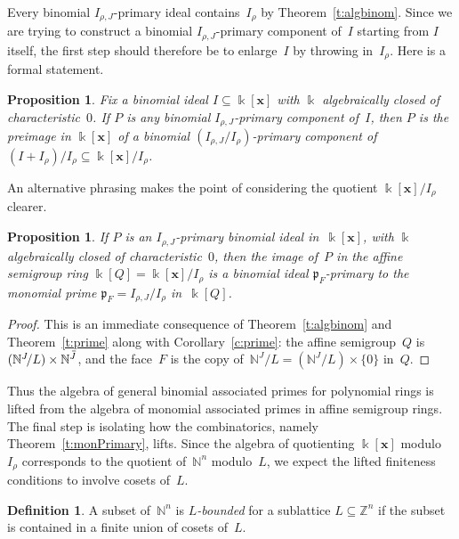 \documentclass[12pt]{amsart}
\numberwithin{equation}{section}
\newtheorem{prop}[thm]{Proposition}
\theoremstyle{definition}
\newtheorem{defn}[thm]{Definition}
\begin{document}
Every binomial $I_{\rho,J}$-primary ideal contains~$I_\rho$ by
Theorem~\ref{t:algbinom}.  Since
we are trying to construct a binomial $I_{\rho,J}$-primary component
of~$I$ starting from $I$ itself, the first step should therefore be to
enlarge~$I$ by throwing in~$I_\rho$.  Here is a formal statement.

\begin{prop}\label{p:polyringPrimary}
Fix a binomial ideal $I \subseteq {\Bbbk}[{\mathbf{x}}]$
with ${\Bbbk}$ algebraically closed of characteristic~$0$.  If $P$ is any
binomial $I_{\rho,J}$-primary component of~$I$, then $P$ is the
preimage in ${\Bbbk}[{\mathbf{x}}]$ of a binomial $(I_{\rho,J}/I_\rho)$-primary
component of $(I + I_\rho)/I_\rho \subseteq {\Bbbk}[{\mathbf{x}}]/I_\rho$.
\end{prop}

An alternative phrasing makes the point of considering the quotient
${\Bbbk}[{\mathbf{x}}]/I_\rho$ clearer.

\begin{prop}\label{p:polyringPrimary'}
If $P$ is an $I_{\rho,J}$-primary binomial ideal in~${\Bbbk}[{\mathbf{x}}]$, with
${\Bbbk}$ algebraically closed of characteristic~$0$, then the image
of~$P$ in the affine semigroup ring ${\Bbbk}[Q] = {\Bbbk}[{\mathbf{x}}]/I_\rho$ is a
binomial ideal ${\mathfrak{p}}_F$-primary to the monomial prime ${\mathfrak{p}}_F =
I_{\rho,J}/I_\rho$ in~${\Bbbk}[Q]$.
\end{prop}
\begin{proof}
This is an immediate consequence of Theorem~\ref{t:algbinom} and
Theorem~\ref{t:prime} along with Corollary~\ref{c:prime}: the affine
semigroup~$Q$ is $({\mathbb{N}}^J\!/L) \times {\mathbb{N}}^{{\hspace{.45ex}\overline{\hspace{-.45ex}J}}}$, and the face~$F$ is the
copy of~${\mathbb{N}}^J\!/L = ({\mathbb{N}}^J\!/L) \times \{0\}$ in~$Q$.
\end{proof}

Thus the algebra of
general binomial associated primes for polynomial rings is lifted from
the algebra of monomial associated primes in affine semigroup rings.
The final step is isolating how the combinatorics, namely
Theorem~\ref{t:monPrimary}, lifts.  Since the algebra of quotienting
${\Bbbk}[{\mathbf{x}}]$ modulo~$I_\rho$ corresponds to the quotient of~${\mathbb{N}}^n$
modulo~$L$, we expect the lifted finiteness conditions to involve
cosets of~$L$.

\begin{defn}
A subset of~${\mathbb{N}}^n$ is \emph{$L$-bounded} for a sublattice $L
\subseteq {\mathbb{Z}}^n$ if the subset is contained in a finite union of
cosets of~$L$.
\end{defn}
\end{document}
